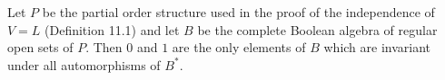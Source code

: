 Let $P$ be the partial order structure used in the proof of the independence of $V = L$ (Definition 11.1) and let $B$ be the complete Boolean algebra of regular open sets of $P$. Then $0$ and $1$ are the only elements of $B$ which are invariant under all automorphisms of $B^*$.
